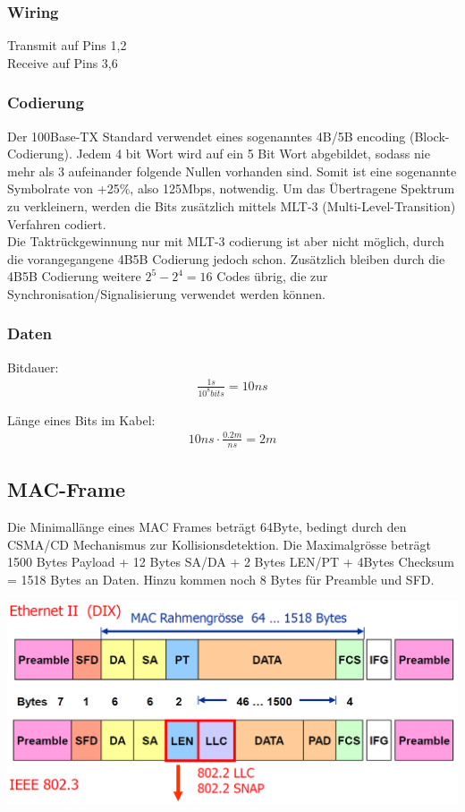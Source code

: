 \subsubsection{Wiring}
Transmit auf Pins 1,2\\
Receive auf Pins 3,6
\subsubsection{Codierung}
Der 100Base-TX Standard verwendet eines sogenanntes 4B/5B encoding (Block-Codierung). Jedem 4 bit Wort wird auf ein 5 Bit Wort abgebildet, sodass nie mehr als 3 aufeinander folgende Nullen vorhanden sind. Somit ist eine sogenannte Symbolrate von +25\%, also 125Mbps, notwendig.
Um das Übertragene Spektrum zu verkleinern, werden die Bits zusätzlich mittels MLT-3 (Multi-Level-Transition) Verfahren codiert.\\
Die Taktrückgewinnung nur mit MLT-3 codierung ist aber nicht möglich, durch die vorangegangene 4B5B Codierung jedoch schon. Zusätzlich bleiben durch die 4B5B Codierung weitere $2^5-2^4=16$ Codes übrig, die zur Synchronisation/Signalisierung verwendet werden können.


\subsubsection{Daten}
Bitdauer:
\begin{align*}
\frac{1s}{10^{8}bits} = 10ns
\end{align*}

Länge eines Bits im Kabel:
\begin{align}
10ns \cdot \frac{0.2m}{ns} = 2m
\end{align}

\subsection{MAC-Frame}
Die Minimallänge eines MAC Frames beträgt 64Byte, bedingt durch den CSMA/CD Mechanismus zur Kollisionsdetektion.
Die Maximalgrösse beträgt 1500 Bytes Payload + 12 Bytes SA/DA + 2 Bytes LEN/PT + 4Bytes Checksum = 1518 Bytes an Daten. Hinzu kommen noch 8 Bytes für Preamble und SFD.

\includegraphics[scale=0.5]{media/MACFrame.png}

